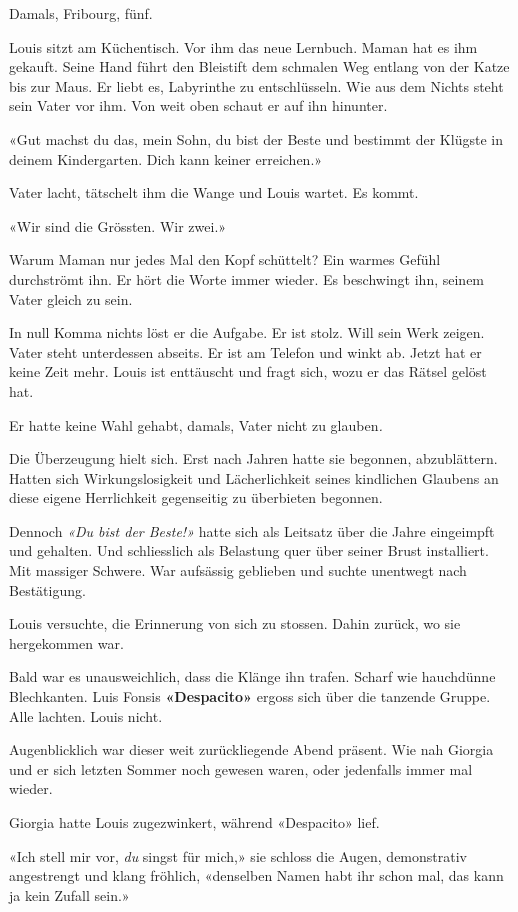 Damals, Fribourg, fünf.

Louis sitzt am Küchentisch. Vor ihm das neue Lernbuch. Maman hat es ihm
gekauft. Seine Hand führt den Bleistift dem schmalen Weg entlang von der
Katze bis zur Maus. Er liebt es, Labyrinthe zu entschlüsseln. Wie aus
dem Nichts steht sein Vater vor ihm. Von weit oben schaut er auf ihn
hinunter.

«Gut machst du das, mein Sohn, du bist der Beste und bestimmt der
Klügste in deinem Kindergarten. Dich kann keiner erreichen.»

Vater lacht, tätschelt ihm die Wange und Louis wartet. Es kommt.

«Wir sind die Grössten. Wir zwei.»

Warum Maman nur jedes Mal den Kopf schüttelt? Ein warmes Gefühl
durchströmt ihn. Er hört die Worte immer wieder. Es beschwingt ihn,
seinem Vater gleich zu sein.

In null Komma nichts löst er die Aufgabe. Er ist stolz. Will sein Werk
zeigen. Vater steht unterdessen abseits. Er ist am Telefon und winkt ab.
Jetzt hat er keine Zeit mehr. Louis ist enttäuscht und fragt sich, wozu
er das Rätsel gelöst hat.

Er hatte keine Wahl gehabt, damals, Vater nicht zu glauben\emph{.}

Die Überzeugung hielt sich. Erst nach Jahren hatte sie begonnen,
abzublättern. Hatten sich Wirkungslosigkeit und Lächerlichkeit seines
kindlichen Glaubens an diese eigene Herrlichkeit gegenseitig zu
überbieten begonnen.

Dennoch \emph{«Du bist der Beste!»} hatte sich als Leitsatz über die
Jahre eingeimpft und gehalten. Und schliesslich als Belastung quer über
seiner Brust installiert. Mit massiger Schwere. War aufsässig geblieben
und suchte unentwegt nach Bestätigung.

Louis versuchte, die Erinnerung von sich zu stossen. Dahin zurück, wo
sie hergekommen war.

Bald war es unausweichlich, dass die Klänge ihn trafen. Scharf wie
hauchdünne Blechkanten. Luis Fonsis \textbf{«Despacito»} ergoss sich
über die tanzende Gruppe. Alle lachten. Louis nicht.

Augenblicklich war dieser weit zurückliegende Abend präsent. Wie nah
Giorgia und er sich letzten Sommer noch gewesen waren, oder jedenfalls
immer mal wieder.

Giorgia hatte Louis zugezwinkert, während «Despacito» lief.

«Ich stell mir vor, \emph{du} singst für mich,» sie schloss die Augen,
demonstrativ angestrengt und klang fröhlich, «denselben Namen habt ihr
schon mal, das kann ja kein Zufall sein.»

